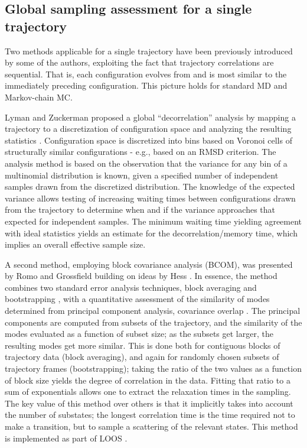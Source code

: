 \subsection{Global sampling assessment for a single trajectory}
Two methods applicable for a single trajectory have been previously introduced by some of the authors, exploiting the fact that trajectory correlations are sequential.
That is, each configuration evolves from and is most similar to the immediately preceding configuration.
This picture holds for standard MD and Markov-chain MC.

Lyman and Zuckerman proposed a global ``decorrelation'' analysis by mapping a trajectory to a discretization of configuration space and analyzing the resulting statistics \cite{Lyman2007a}.
Configuration space is discretized into bins based on Voronoi cells of structurally similar configurations - e.g., based on an RMSD criterion.
The analysis method is based on the observation that the variance for any bin of a multinomial distribution is known, given a specified number of independent samples drawn from the discretized distribution.
The knowledge of the expected variance allows testing of increasing waiting times between configurations drawn from the trajectory to determine when and if the variance approaches that expected for independent samples.
The minimum waiting time yielding agreement with ideal statistics yields an estimate for the decorrelation/memory time, which implies an overall effective sample size.

A second method, employing block covariance analysis (BCOM), was presented by Romo and Grossfield \cite{Romo2011} building on ideas by Hess \cite{Hess2002}.  In essence, the method combines two standard error analysis techniques, block averaging \cite{Flyvbjerg-1989} and bootstrapping \cite{Tibshirani1998}, with a quantitative assessment of the similarity of modes determined from principal component analysis, covariance overlap \cite{Hess2002}.  The principal components are computed from subsets of the trajectory, and the similarity of the modes evaluated as a function of subset size; as the subsets get larger, the resulting modes get more similar.  This is done both for contiguous blocks of trajectory data (block averaging), and again for randomly chosen subsets of trajectory frames (bootstrapping); taking the ratio of the two values as a function of block size yields the degree of correlation in the data.  Fitting that ratio to a sum of exponentials allows one to extract the relaxation times in the sampling.  The key value of this method over others is that it implicitly takes into account the number of substates; the longest correlation time is the time required not to make a transition, but to sample a scattering of the relevant states.  This method is implemented as part of LOOS \cite{LOOS,LOOS-JCC}.

